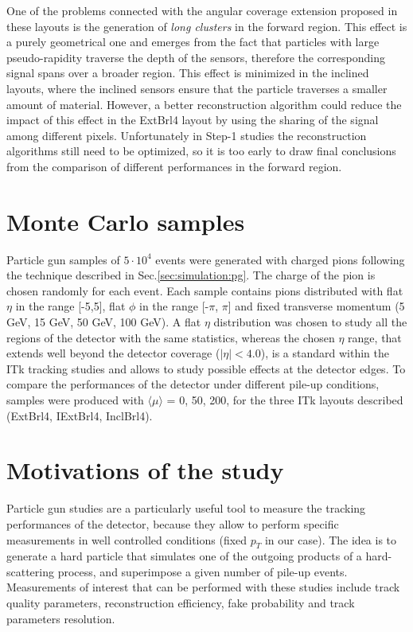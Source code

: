 \documentclass[a4paper,twoside,12pt]{book}
\begin{document}
One of the problems connected with the angular coverage extension proposed in these layouts is the generation of \textit{long clusters} in the forward region. This effect is a purely 
geometrical one and emerges from the fact that particles with large pseudo-rapidity traverse the depth of the sensors, therefore the corresponding signal spans over a broader region. This effect is
minimized in the inclined layouts, where the inclined sensors ensure that the particle traverses a smaller amount of material. However, a better reconstruction algorithm could reduce
the impact of this effect in the ExtBrl4 layout by using the sharing 
of the signal among different pixels. Unfortunately in Step-1 studies the reconstruction algorithms still need to be optimized,
so it is too early to draw final conclusions from the comparison of different performances in the forward region. \\

\section{Monte Carlo samples}\label{sec:tracking:sampleProduction}
Particle gun samples of $5\cdot 10^4$ events were generated with charged pions following the technique described in Sec.\ref{sec:simulation:pg}. The charge of the pion
is chosen randomly for each event. 
Each sample contains pions distributed with flat $\eta$ in the range [-5,5], flat $\phi$ in the range [-$\pi$, $\pi$] and fixed transverse momentum (5 GeV, 15 GeV, 50 GeV, 100 GeV). 
A flat $\eta$ distribution was chosen to study all the regions of the detector with the same statistics, whereas the chosen $\eta$ range, that extends well beyond the detector coverage ($|\eta| < 4.0$),
is a standard within the ITk tracking studies and allows to study possible effects at the detector edges. 
To compare the performances of the detector under different pile-up conditions, samples were produced with $\langle\mu\rangle$ = 0, 50, 200, for the three ITk layouts described (ExtBrl4,
IExtBrl4, InclBrl4).

\section{Motivations of the study}
Particle gun studies are a particularly useful tool to measure the tracking performances of the detector, because they allow to perform
specific measurements in well controlled conditions (fixed $p_{T}$ in our case). The idea is to generate a hard particle that
simulates one of the outgoing products of a hard-scattering process, and superimpose a given number of pile-up events. Measurements of interest that can be performed 
with these studies include track quality parameters, reconstruction efficiency, fake probability and track parameters resolution.\\
\end{document}
